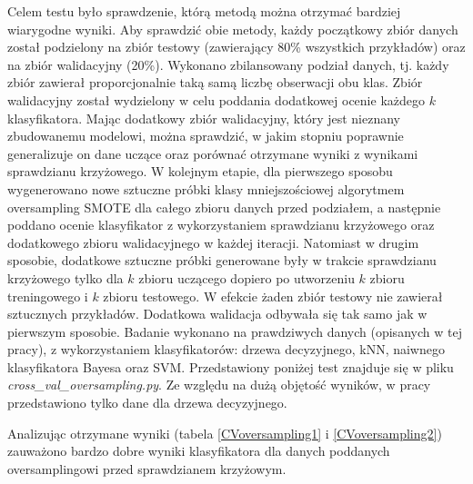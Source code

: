 Celem testu było sprawdzenie, którą metodą można otrzymać bardziej wiarygodne wyniki. Aby sprawdzić obie metody, każdy początkowy zbiór danych został podzielony na zbiór testowy (zawierający 80\% wszystkich przykładów) oraz na zbiór walidacyjny (20\%). Wykonano zbilansowany podział danych, tj. każdy zbiór zawierał proporcjonalnie taką samą liczbę obserwacji obu klas. Zbiór walidacyjny został wydzielony w celu poddania dodatkowej ocenie każdego $k$ klasyfikatora. Mając dodatkowy zbiór walidacyjny, który jest nieznany zbudowanemu modelowi, można sprawdzić, w jakim stopniu poprawnie generalizuje on dane uczące oraz porównać otrzymane wyniki z wynikami sprawdzianu krzyżowego. W kolejnym etapie, dla pierwszego sposobu wygenerowano nowe sztuczne próbki klasy mniejszościowej algorytmem oversampling SMOTE dla całego zbioru danych przed podziałem, a następnie poddano ocenie klasyfikator z wykorzystaniem sprawdzianu krzyżowego oraz dodatkowego zbioru walidacyjnego w każdej iteracji. Natomiast w drugim sposobie, dodatkowe sztuczne próbki generowane były w trakcie sprawdzianu krzyżowego tylko dla $k$ zbioru uczącego dopiero po utworzeniu $k$ zbioru treningowego i $k$ zbioru testowego. W efekcie żaden zbiór testowy nie zawierał sztucznych przykładów. Dodatkowa walidacja odbywała się tak samo jak w pierwszym sposobie. Badanie wykonano na prawdziwych danych (opisanych w tej pracy), z wykorzystaniem klasyfikatorów: drzewa decyzyjnego, kNN, naiwnego klasyfikatora Bayesa oraz SVM. Przedstawiony poniżej test znajduje się w pliku \textit{cross\_val\_oversampling.py}. Ze względu na dużą objętość wyników, w pracy przedstawiono tylko dane dla drzewa decyzyjnego. \par
Analizując otrzymane wyniki (tabela \ref{CVoversampling1} i \ref{CVoversampling2}) zauważono bardzo dobre wyniki klasyfikatora dla danych poddanych oversamplingowi przed sprawdzianem krzyżowym.
